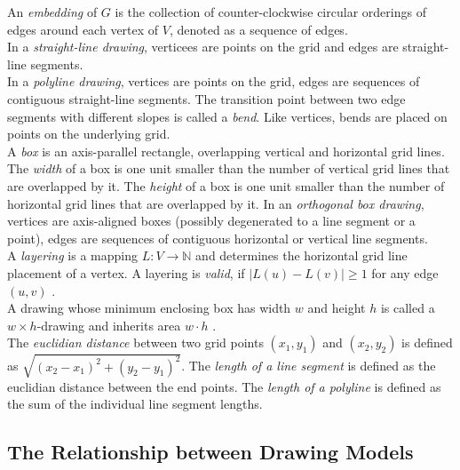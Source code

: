 An \emph{embedding} of $G$ is the collection of counter-clockwise circular orderings of edges around each vertex of $V$, denoted as a sequence of edges.\\
In a \emph{straight-line drawing}, verticees are points on the grid and edges are straight-line segments.\\
In a \emph{polyline drawing}, vertices are points on the grid, edges are sequences of contiguous straight-line segments. The transition point between two edge segments with different slopes is called a \emph{bend}. Like vertices, bends are placed on points on the underlying grid.\\
A \emph{box} is an axis-parallel rectangle, overlapping vertical and horizontal grid lines. The \emph{width} of a box is one unit smaller than the number of vertical grid lines that are overlapped by it. The \emph{height} of a box is one unit smaller than the number of horizontal grid lines that are overlapped by it.
In an \emph{orthogonal box drawing}, vertices are axis-aligned boxes (possibly degenerated to a line segment or a point), edges are sequences of contiguous horizontal or vertical line segments. \cite[P. 144ff]{Biedl_SP}\\
A \emph{layering} is a mapping $L: V \to \mathbb{N}$ and determines the horizontal grid line placement of a vertex. A layering is \emph{valid}, if $|L(u) - L(v)| \geq 1$ for any edge $(u,v)$ \cite[P. 4]{Ruegg_Layering}.\\
A drawing whose minimum enclosing box has width $w$ and height $h$ is called a $w\times h$-drawing and inherits area $w\cdot h$ \cite[P. 145]{Biedl_SP}.\\
The \emph{euclidian distance} between two grid points $(x_1,y_1)$ and $(x_2,y_2)$ is defined as $\sqrt{(x_2-x_1)^2 + (y_2-y_1)^2}$.
The \emph{length of a line segment} is defined as the euclidian distance between the end points. The \emph{length of a polyline} is defined as the sum of the individual line segment lengths.

\subsection{The Relationship between Drawing Models}

